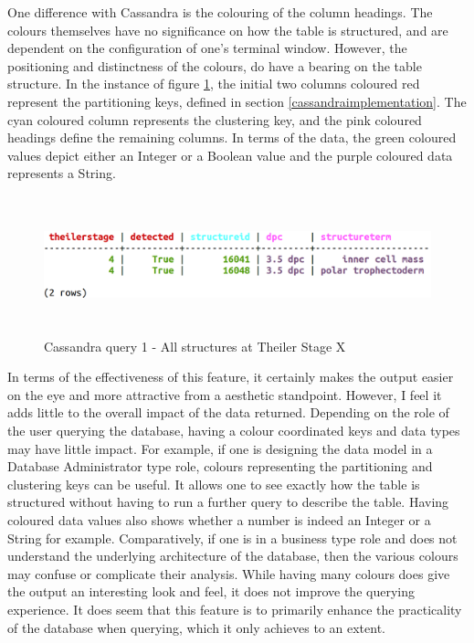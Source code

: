 One difference with Cassandra is the colouring of the column headings. The colours themselves have no significance on how the table is structured, and are dependent on the configuration of one's terminal window. However, the positioning and distinctness of the colours, do have a bearing on the table structure. In the instance of figure \ref{fig:cassandraquery1}, the initial two columns coloured red represent the partitioning keys, defined in section \ref{cassandraimplementation}. The cyan coloured column represents the clustering key, and the pink coloured headings define the remaining columns. In terms of the data, the green coloured values depict either an Integer or a Boolean value and the purple coloured data represents a String.

\begin{figure}[H]\begin{center}\includegraphics[height=4cm,width=0.9\linewidth]{images/cassandraquery1}\caption{Cassandra query 1 - All structures at Theiler Stage X}\label{fig:cassandraquery1}\end{center}\end{figure}

In terms of the effectiveness of this feature, it certainly makes the output easier on the eye and more attractive from a aesthetic standpoint. However, I feel it adds little to the overall impact of the data returned. Depending on the role of the user querying the database, having a colour coordinated keys and data types may have little impact. For example, if one is designing the data model in a Database Administrator type role, colours representing the partitioning and clustering keys can be useful. It allows one to see exactly how the table is structured without having to run a further query to describe the table. Having coloured data values also shows whether a number is indeed an Integer or a String for example. Comparatively, if one is in a business type role and does not understand the underlying architecture of the database, then the various colours may confuse or complicate their analysis. While having many colours does give the output an interesting look and feel, it does not improve the querying experience. It does seem that this feature is to primarily enhance the practicality of the database when querying, which it only achieves to an extent.

